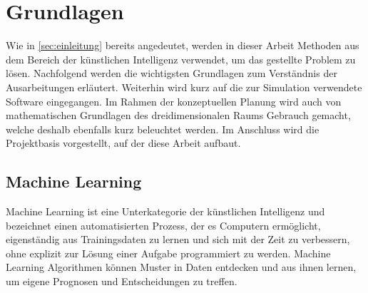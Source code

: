 \chapter{Grundlagen}
Wie in \autoref{sec:einleitung} bereits angedeutet, werden in dieser Arbeit Methoden aus dem Bereich der künstlichen Intelligenz verwendet, um das gestellte Problem zu lösen.
Nachfolgend werden die wichtigsten Grundlagen zum Verständnis der Ausarbeitungen erläutert.
Weiterhin wird kurz auf die zur Simulation verwendete Software eingegangen.
Im Rahmen der konzeptuellen Planung wird auch von mathematischen Grundlagen des dreidimensionalen Raums Gebrauch gemacht, welche deshalb ebenfalls kurz beleuchtet werden.
Im Anschluss wird die Projektbasis vorgestellt, auf der diese Arbeit aufbaut.

\section{Machine Learning}
Machine Learning ist eine Unterkategorie der künstlichen Intelligenz und bezeichnet einen automatisierten Prozess, der es Computern ermöglicht, eigenständig aus Trainingsdaten zu lernen und sich mit der Zeit zu verbessern, ohne explizit zur Lösung einer Aufgabe programmiert zu werden.
Machine Learning Algorithmen können Muster in Daten entdecken und aus ihnen lernen, um eigene Prognosen und Entscheidungen zu treffen.

